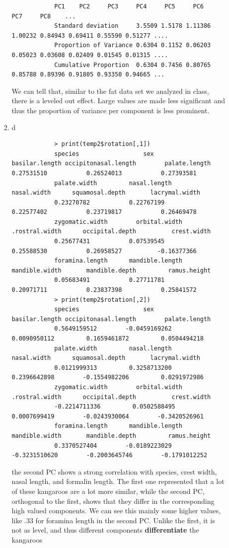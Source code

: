\documentclass[11pt]{article}
\begin{document}
\begin{enumerate}
\begin{enumerate}
\begin{enumerate}
\begin{verbatim}
			PC1    PC2     PC3     PC4     PC5     PC6     PC7     PC8    ...
			Standard deviation     3.5509 1.5178 1.11386 1.00232 0.84943 0.69411 0.55590 0.51277 ....
			Proportion of Variance 0.6304 0.1152 0.06203 0.05023 0.03608 0.02409 0.01545 0.01315 ....
			Cumulative Proportion  0.6304 0.7456 0.80765 0.85788 0.89396 0.91805 0.93350 0.94665 ...
		\end{verbatim}
		We can tell that, similar to the fat data set we analyzed in class, there is a leveled out effect. Large values are made less significant and thus the proportion of variance per component is less prominent.
		\item d
		\begin{verbatim}
			> print(temp2$rotation[,1])
			species                  sex       basilar.length occipitonasal.length        palate.length 0.27531510           0.26524013           0.27393581 
			palate.width         nasal.length          nasal.width      squamosal.depth       lacrymal.width 
			0.23270782           0.22767199           0.22577402           0.23719817           0.26469478 
			zygomatic.width        orbital.width       .rostral.width      occipital.depth          crest.width 
			0.25677431           0.07539545           0.25588530           0.26958527          -0.16377366 
			foramina.length      mandible.length       mandible.width       mandible.depth         ramus.height 
			0.05683491           0.27711781           0.20971711           0.23837398           0.25841572 
			> print(temp2$rotation[,2])
			species                  sex       basilar.length occipitonasal.length        palate.length 
			0.5649159512        -0.0459169262         0.0090950112         0.1659461872         0.0504494218 
			palate.width         nasal.length          nasal.width      squamosal.depth       lacrymal.width 
			0.0121999313         0.3258713200         0.2396642898        -0.1554982206         0.0291972986 
			zygomatic.width        orbital.width       .rostral.width      occipital.depth          crest.width 
			-0.2214711336         0.0502588495         0.0007699419        -0.0243930064        -0.3420526961 
			foramina.length      mandible.length       mandible.width       mandible.depth         ramus.height 
			0.3370527404        -0.0189223029        -0.3231510620        -0.2003645746        -0.1791012252 
		\end{verbatim}
		the second PC shows a strong correlation with species, crest width, nasal length, and formalin length. The first one represented that a lot of these kangaroos are a lot more similar, while the second PC, orthogonal to the first, shows that they differ in the corresponding high valued components. We can see this mainly some higher values, like .33 for foramina length in the second PC. Unlike the first, it is not as level, and thus different components \textbf{differentiate} the kangaroos

\end{enumerate}
\end{enumerate}
\end{enumerate}
\end{document}
